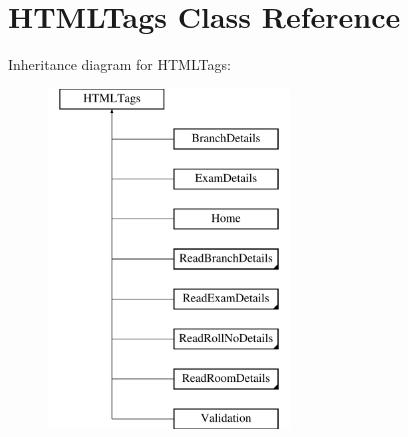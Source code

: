 \hypertarget{classHTMLTags}{\section{H\-T\-M\-L\-Tags Class Reference}
\label{classHTMLTags}
}
Inheritance diagram for H\-T\-M\-L\-Tags\-:\begin{figure}[H]
\begin{center}
\leavevmode
\includegraphics[height=9.000000cm]{classHTMLTags}
\end{center}
\end{figure}
